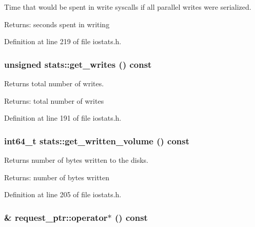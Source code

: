 Time that would be spent in write syscalls if all parallel writes were serialized. 

\begin{Desc}
\item[Returns:]seconds spent in writing \end{Desc}


Definition at line 219 of file iostats.h.\hypertarget{group__iolayer_gf75ae32372c803dcf31e58b0a5e312e2}{
\subsubsection[{get\_\-writes}]{\setlength{\rightskip}{0pt plus 5cm}unsigned stats::get\_\-writes () const}}
\label{group__iolayer_gf75ae32372c803dcf31e58b0a5e312e2}


Returns total number of writes. 

\begin{Desc}
\item[Returns:]total number of writes \end{Desc}


Definition at line 191 of file iostats.h.\hypertarget{group__iolayer_g29a2dd5f32d956bae0b02503ac7d0876}{
\subsubsection[{get\_\-written\_\-volume}]{\setlength{\rightskip}{0pt plus 5cm}int64\_\-t stats::get\_\-written\_\-volume () const}}
\label{group__iolayer_g29a2dd5f32d956bae0b02503ac7d0876}


Returns number of bytes written to the disks. 

\begin{Desc}
\item[Returns:]number of bytes written \end{Desc}


Definition at line 205 of file iostats.h.\hypertarget{group__iolayer_g15bd551f80acd18f2d0e3a1aade2b40c}{
\subsubsection[{operator$\ast$}]{\& request\_\-ptr::operator$\ast$ () const}}
\label{group__iolayer_g15bd551f80acd18f2d0e3a1aade2b40c}


